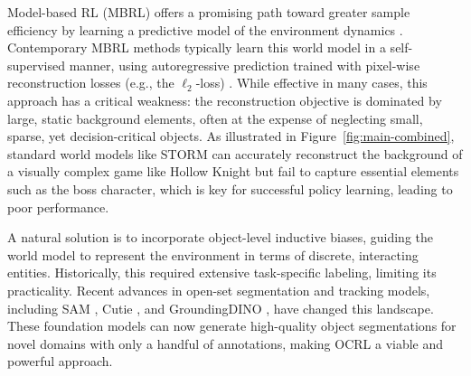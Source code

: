 \documentclass{article} %
\begin{document}
Model-based RL (MBRL) offers a promising path toward greater sample efficiency by learning a predictive model of the environment dynamics \citep{sutton_reinforcement_2018, ha_world_2018}. Contemporary MBRL methods typically learn this world model in a self-supervised manner, using autoregressive prediction trained with pixel-wise reconstruction losses (e.g., the $\ell_2$-loss) \citep{hafner_mastering_2023, zhang_storm_2023, micheli_transformers_2022}. While effective in many cases, this approach has a critical weakness: the reconstruction objective is dominated by large, static background elements, often at the expense of neglecting small, sparse, yet decision-critical objects. As illustrated in Figure~\ref{fig:main-combined}, standard world models like STORM can accurately reconstruct the background of a visually complex game like Hollow Knight but fail to capture essential elements such as the boss character, which is key for successful policy learning, leading to poor performance.

A natural solution is to incorporate object-level inductive biases, guiding the world model to represent the environment in terms of discrete, interacting entities. Historically, this required extensive task-specific labeling, limiting its practicality. Recent advances in open-set segmentation and tracking models, including SAM \citep{kirillov_segment_2023, ravi_sam_2024}, Cutie \citep{cheng_putting_2023}, and GroundingDINO \citep{liu_grounding_2023}, have changed this landscape. These foundation models can now generate high-quality object segmentations for novel domains with only a handful of annotations, making OCRL a viable and powerful approach.
\end{document}
